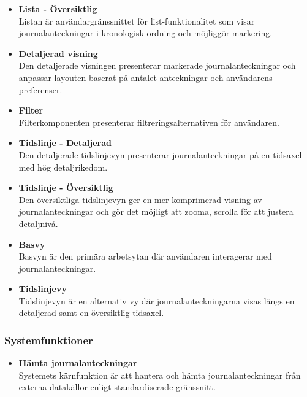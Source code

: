 \documentclass{article}
\begin{document}
\begin{itemize}
    \item \textbf{Lista - Översiktlig} \\
    Listan är användargränssnittet för list-funktionalitet som visar journalanteckningar i kronologisk ordning och möjliggör markering.

    \item \textbf{Detaljerad visning} \\
    Den detaljerade visningen presenterar markerade journalanteckningar och anpassar layouten baserat på antalet anteckningar och användarens preferenser.

    \item \textbf{Filter} \\
    Filterkomponenten presenterar filtreringsalternativen för användaren.

    \item \textbf{Tidslinje - Detaljerad} \\
    Den detaljerade tidslinjevyn presenterar journalanteckningar på en tidsaxel med hög detaljrikedom.

    \item \textbf{Tidslinje - Översiktlig} \\
    Den översiktliga tidslinjevyn ger en mer komprimerad visning av journalanteckningar och gör det möjligt att zooma, scrolla för att justera detaljnivå.

    \item \textbf{Basvy} \\
    Basvyn är den primära arbetsytan där användaren interagerar med journalanteckningar.

    \item \textbf{Tidslinjevy} \\
    Tidslinjevyn är en alternativ vy där journalanteckningarna visas längs en detaljerad samt en översiktlig tidsaxel.
\end{itemize}

\subsubsection{Systemfunktioner}

\begin{itemize}
    \item \textbf{Hämta journalanteckningar} \\
    Systemets kärnfunktion är att hantera och hämta journalanteckningar från externa datakällor enligt standardiserade gränssnitt.
\end{itemize}
\end{document}
